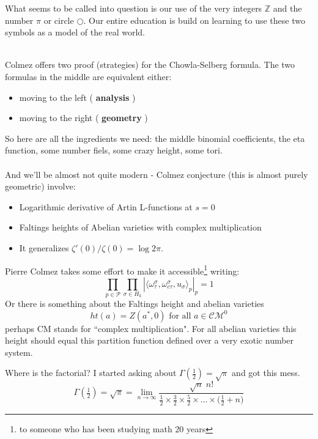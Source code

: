 \documentclass[12pt]{article}
\begin{document}
\noindent What seems to be called into question is our use of the very integers $\mathbb{Z}$ and the  number $\pi$ or circle $\bigcirc$.  Our entire education is build on learning to use these two symbols as a model of the real world. 
 \\
Colmez offers two proof (strategies) for the Chowla-Selberg formula.  The two formulas in the middle are equivalent either:
\begin{itemize}
\item moving to the left ( \textbf{analysis} )
\item moving to the right ( \textbf{geometry} )
\end{itemize}
So here are all the ingredients we need: the middle binomial coefficients, the eta function, some number fiels, some crazy height, some tori. \\ \\
And we'll be almost not quite modern - Colmez conjecture (this is almost purely geometric) involve:
\begin{itemize}
\item Logarithmic derivative of Artin L-functions at $s= 0$
\item Faltings heights of Abelian varieties with complex multiplication
\item It generalizes $\zeta'(0)/\zeta(0) = \log 2\pi$.
\end{itemize}
Pierre Colmez takes some effort to make it accessible\footnote{to someone who has been studying math 20 years} writing:
$$\prod_{p \in \mathcal{P}} \prod_{\sigma\in H_k} | \langle \omega_\tau^\sigma, \omega_{c\tau}^\sigma , u_\sigma \rangle_p |_p = 1 $$
Or there is something about the Faltings height and abelian varieties
$$ ht(a) = Z(a^\ast, 0) \text{ for all } a \in \mathcal{CM}^0 $$
perhaps CM stands for ``complex multiplication".  For all abelian varieties this height should equal this partition function defined over a very exotic number system.

\newpage

\noindent Where is the factorial?  I started asking about $\Gamma(\frac{1}{2}) = \sqrt{\pi}$ and got this mess.  
$$\Gamma(\tfrac{1}{2}) = \sqrt{\pi} = \lim_{n \to \infty}
\frac{ \sqrt{n} \;n!}{ \frac{1}{2} \times \frac{3}{2} \times \frac{5}{2} \times \dots \times \big(\frac{1}{2}+n\big)} $$

\newpage
\end{document}

